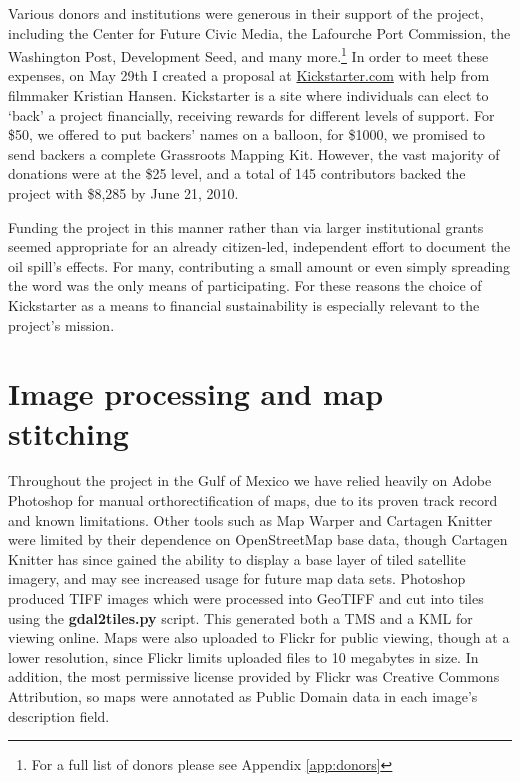 \documentclass[11pt,oneside,notitlepage]{report}
\begin{document}
Various donors and institutions were generous in their support of the project, including the Center for Future Civic Media, the Lafourche Port Commission, the Washington Post, Development Seed, and many more.\footnote{For a full list of donors please see Appendix \ref{app:donors}} In order to meet these expenses, on May 29th I created a proposal at \href{http://kickstarter.com}{Kickstarter.com} with help from filmmaker Kristian Hansen. Kickstarter is a site where individuals can elect to `back' a project financially, receiving rewards for different levels of support. For \$50, we offered to put backers' names on a balloon, for \$1000, we promised to send backers a complete Grassroots Mapping Kit. However, the vast majority of donations were at the \$25 level, and a total of 145 contributors backed the project with \$8,285 by June 21, 2010.

Funding the project in this manner rather than via larger institutional grants seemed appropriate for an already citizen-led, independent effort to document the oil spill's effects. For many, contributing a small amount or even simply spreading the word was the only means of participating. For these reasons the choice of Kickstarter as a means to financial sustainability is especially relevant to the project's mission. 

\section{Image processing and map stitching}

Throughout the project in the Gulf of Mexico we have relied heavily on Adobe Photoshop for manual orthorectification of maps, due to its proven track record and known limitations. Other tools such as Map Warper and Cartagen Knitter were limited by their dependence on OpenStreetMap base data, though Cartagen Knitter has since gained the ability to display a base layer of tiled satellite imagery, and may see increased usage for future map data sets. Photoshop produced \ac{TIFF} images which were processed into \ac{GeoTIFF} and cut into tiles using the \textbf{gdal2tiles.py} script. This generated both a \ac{TMS} and a \ac{KML} for viewing online. Maps were also uploaded to Flickr for public viewing, though at a lower resolution, since Flickr limits uploaded files to 10 megabytes in size. In addition, the most permissive license provided by Flickr was Creative Commons Attribution, so maps were annotated as Public Domain data in each image's description field. 
\end{document}
